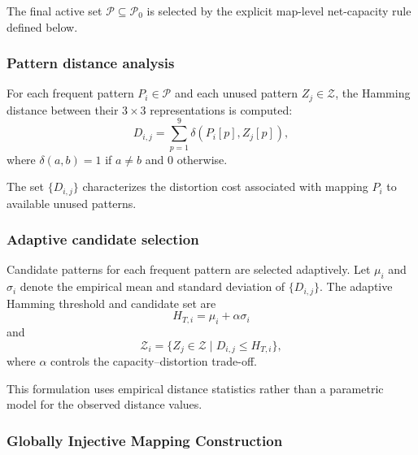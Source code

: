 \documentclass[a4paper,fleqn]{cas-dc}
\newcommand{\RevisionAddBegin}{\begingroup\color{revisionblue}}
\newcommand{\RevisionAddEnd}{\endgroup}
\begin{document}
The final active set $\mathcal{P}\subseteq\mathcal{P}_0$ is selected by the
\RevisionAddBegin
explicit map-level net-capacity rule defined below.
\RevisionAddEnd

\subsubsection*{Pattern distance analysis}

For each frequent pattern $P_i \in \mathcal{P}$ and each unused pattern $Z_j \in \mathcal{Z}$,
the Hamming distance between their $3 \times 3$ representations is computed:
\begin{equation}
D_{i,j} = \sum_{p=1}^{9} \delta(P_i[p], Z_j[p]),
\label{eq:hamming-distance}
\end{equation}
where $\delta(a,b)=1$ if $a\neq b$ and $0$ otherwise.

The set $\{D_{i,j}\}$ characterizes the distortion cost associated with mapping $P_i$ to available unused patterns.

\subsubsection*{Adaptive candidate selection}

Candidate patterns for each frequent pattern are selected adaptively.
Let $\mu_i$ and $\sigma_i$ denote the empirical mean and standard deviation of $\{D_{i,j}\}$.
The adaptive Hamming threshold and candidate set are
\begin{equation}
H_{T,i}=\mu_i+\alpha\sigma_i
\label{eq:adaptive-threshold}
\end{equation}
and
\begin{equation}
\mathcal{Z}_i = \{ Z_j \in \mathcal{Z} \mid D_{i,j} \le H_{T,i} \},
\label{eq:adaptive-candidate-set}
\end{equation}
where $\alpha$ controls the capacity--distortion trade-off.

\RevisionAddBegin
This formulation uses empirical distance statistics rather than a parametric
model for the observed distance values.
\RevisionAddEnd

\subsubsection{Globally Injective Mapping Construction}
\end{document}
